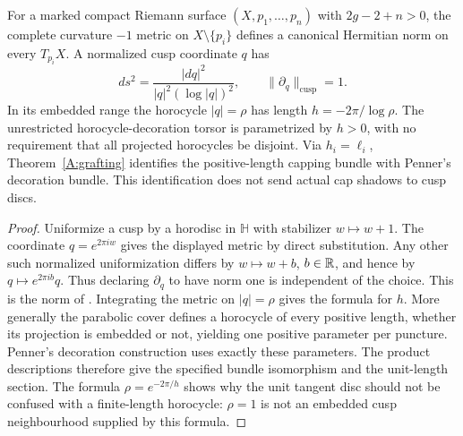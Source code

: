 \begin{proposition}\label{A:cuspnorm}
For a marked compact Riemann surface $(X,p_1,\ldots,p_n)$ with
$2g-2+n>0$, the complete curvature $-1$ metric on
$X\setminus\{p_i\}$ defines a canonical Hermitian norm on every
$T_{p_i}X$. A normalized cusp coordinate $q$ has
\[
 ds^2=\frac{|dq|^2}{|q|^2(\log|q|)^2},\qquad
 \|\partial_q\|_{\mathrm{cusp}}=1.
\]
In its embedded range the horocycle $|q|=\rho$ has length
$h=-2\pi/\log\rho$. The unrestricted horocycle-decoration torsor is
parametrized by $h>0$, with no requirement that all projected
horocycles be disjoint. Via $h_i=\ell_i$, Theorem~\ref{A:grafting}
identifies the positive-length capping bundle with Penner's
decoration bundle. This identification does not send actual cap
shadows to cusp discs.
\end{proposition}
\begin{proof}
Uniformize a cusp by a horodisc in $\mathbb H$ with stabilizer
$w\mapsto w+1$. The coordinate $q=e^{2\pi i w}$ gives the displayed
metric by direct substitution. Any other such normalized
uniformization differs by $w\mapsto w+b$, $b\in{\mathbb{R}}$, and hence by
$q\mapsto e^{2\pi i b}q$. Thus declaring $\partial_q$ to have norm
one is independent of the choice. This is the norm of
\citet[Definition~1 and Lemma~2]{Wolpert2007}. Integrating the metric on
$|q|=\rho$ gives the formula for $h$. More generally the parabolic
cover defines a horocycle of every positive length, whether its
projection is embedded or not, yielding one positive parameter per
puncture. Penner's decoration construction \citep[\S1]{Penner1987} uses exactly these
parameters. The product descriptions therefore give the specified
bundle isomorphism and the unit-length section. The formula
$\rho=e^{-2\pi/h}$ shows why the unit tangent disc should not be
confused with a finite-length horocycle: $\rho=1$ is not an embedded
cusp neighbourhood supplied by this formula.
\end{proof}

